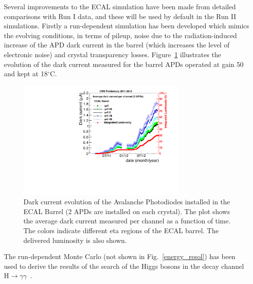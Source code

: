 \documentclass[journal]{IEEEtran}
\begin{document}
Several improvements to the ECAL simulation have been made from detailed comparisons with Run I data, and these will be used by default in the Run II simulations. Firstly a run-dependent simulation has been developed which mimics the evolving conditions, in terms of pileup, noise due to the radiation-induced increase of the APD dark current in the barrel (which increases the level of electronic noise) and crystal transparency losses. Figure~\ref{fig:idark} illustrates the evolution of the dark current measured for the barrel APDs operated at gain 50 and kept at 18$^\circ$C. 
%
\begin{figure}[!t]
  \begin{center}
    \includegraphics[width=3.3in]{HV_avg_history}
    \caption{Dark current evolution of the Avalanche Photodiodes installed in the ECAL Barrel (2 APDs are installed on each crystal). The plot shows the average dark current measured per channel as a function of time. The colors indicate different eta regions of the ECAL barrel. The delivered luminosity is also shown. \label{fig:idark}}
  \end{center}
\end{figure}
%
The run-dependent Monte Carlo (not shown in Fig.~\ref{energy_resol}) has been used to derive the results of the search of the Higgs bosons in the decay channel H$\to\gamma\gamma$~\cite{Khachatryan:2014ira}.
\end{document}
